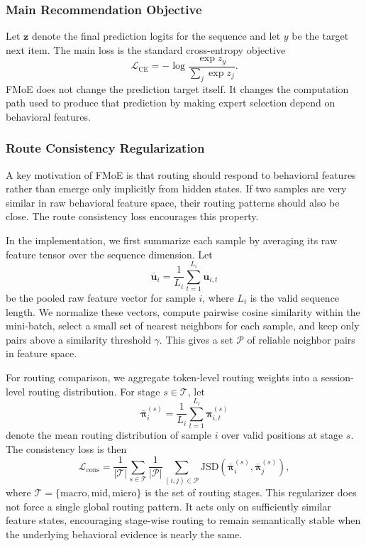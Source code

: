 \documentclass[sigconf,authordraft]{acmart}
\begin{document}
\subsubsection{Main Recommendation Objective}

Let $\mathbf{z}$ denote the final prediction logits for the sequence and let $y$ be the target next item. The main loss is the standard cross-entropy objective
\[
\mathcal{L}_{\mathrm{CE}}
=
-\log \frac{\exp z_y}{\sum_{j}\exp z_j}.
\]
FMoE does not change the prediction target itself. It changes the computation path used to produce that prediction by making expert selection depend on behavioral features.

\subsubsection{Route Consistency Regularization}

A key motivation of FMoE is that routing should respond to behavioral features rather than emerge only implicitly from hidden states. If two samples are very similar in raw behavioral feature space, their routing patterns should also be close. The route consistency loss encourages this property.

In the implementation, we first summarize each sample by averaging its raw feature tensor over the sequence dimension. Let
\[
\bar{\mathbf{u}}_i
=
\frac{1}{L_i}\sum_{t=1}^{L_i}\mathbf{u}_{i,t}
\]
be the pooled raw feature vector for sample $i$, where $L_i$ is the valid sequence length. We normalize these vectors, compute pairwise cosine similarity within the mini-batch, select a small set of nearest neighbors for each sample, and keep only pairs above a similarity threshold $\gamma$. This gives a set $\mathcal{P}$ of reliable neighbor pairs in feature space.

For routing comparison, we aggregate token-level routing weights into a session-level routing distribution. For stage $s \in \mathcal{T}$, let
\[
\bar{\boldsymbol{\pi}}_i^{(s)}
=
\frac{1}{L_i}\sum_{t=1}^{L_i}\boldsymbol{\pi}^{(s)}_{i,t}
\]
denote the mean routing distribution of sample $i$ over valid positions at stage $s$. The consistency loss is then
\[
\mathcal{L}_{\mathrm{cons}}
=
\frac{1}{|\mathcal{T}|}
\sum_{s \in \mathcal{T}}
\frac{1}{|\mathcal{P}|}
\sum_{(i,j)\in \mathcal{P}}
\mathrm{JSD}\!\left(\bar{\boldsymbol{\pi}}_i^{(s)}, \bar{\boldsymbol{\pi}}_j^{(s)}\right),
\]
where $\mathcal{T}=\{\mathrm{macro},\mathrm{mid},\mathrm{micro}\}$ is the set of routing stages. This regularizer does not force a single global routing pattern. It acts only on sufficiently similar feature states, encouraging stage-wise routing to remain semantically stable when the underlying behavioral evidence is nearly the same.
\end{document}
